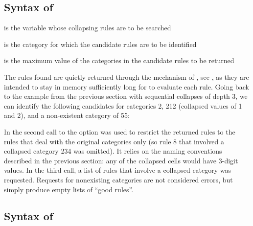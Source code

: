 \bigskip

\begin{stlog}
\nullskip
\end{stlog}


\subsection{Syntax of }


\hangpara
{} is the variable whose collapsing rules are to be searched

\hangpara
{} is the category for which the candidate rules are to be identified

\hangpara
{} is the maximum value of the categories in the candidate rules to be returned

The rules found are quietly returned through the mechanism of ,
see , as they are intended to stay in memory sufficiently long for
 to evaluate each rule. Going back to the example
from the previous section
with sequential collapses of depth 3, we can identify the following candidates
for categories 2, 212 (collapsed values of 1 and 2), and a non-existent category of 55:

\begin{stlog}
\nullskip
\end{stlog}

In the second call to
the option  was used to restrict the returned rules to the rules
that deal with the original categories only (so rule 8 that involved a collapsed category 234
was omitted). It relies on the naming conventions described in the previous section:
any of the collapsed cells would have 3-digit values.
In the third call, a list of rules
that involve a collapsed category  was requested. Requests
for nonexisting categories are not considered errors, but simply produce empty lists
of ``good rules''.

\subsection{Syntax of }

